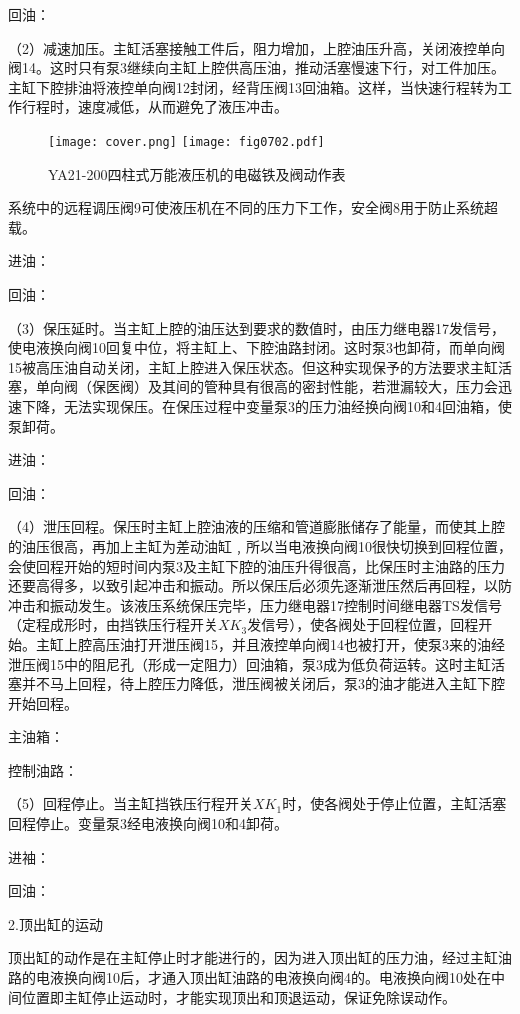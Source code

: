 

\noindent 回油：

（2）减速加压。主缸活塞接触工件后，阻力增加，上腔油压升高，关闭液控单向阀14。这时只有泵3继续向主缸上腔供高压油，推动活塞慢速下行，对工件加压。主缸下腔排油将液控单向阀12封闭，经背压阀13回油箱。这样，当快速行程转为工作行程时，速度减低，从而避免了液压冲击。

\begin{figure}
\centering
\ifOpenSource
\texttt{[image: cover.png]}
\else
\texttt{[image: fig0702.pdf]}
\fi
\caption{YA21-200四柱式万能液压机的电磁铁及阀动作表}
\label{fig:fig0702}
\end{figure}

系统中的远程调压阀9可使液压机在不同的压力下工作，安全阀8用于防止系统超载。

进油：

回油：

（3）保压延时。当主缸上腔的油压达到要求的数值时，由压力继电器17发信号，使电液换向阀10回复中位，将主缸上、下腔油路封闭。这时泵3也卸荷，而单向阀15被高压油自动关闭，主缸上腔进入保压状态。但这种实现保予的方法要求主缸活塞，单向阀（保医阀）及其间的管种具有很高的密封性能，若泄漏较大，压力会迅速下降，无法实现保压。在保压过程中变量泵3的压力油经换向阀10和4回油箱，使泵卸荷。

进油：

回油：

（4）泄压回程。保压时主缸上腔油液的压缩和管道膨胀储存了能量，而使其上腔的油压很高，再加上主缸为差动油缸﹐所以当电液换向阀10很快切换到回程位置，会使回程开始的短时间内泵3及主缸下腔的油压升得很高，比保压时主油路的压力还要高得多，以致引起冲击和振动。所以保压后必须先逐渐泄压然后再回程，以防冲击和振动发生。该液压系统保压完毕，压力继电器17控制时间继电器TS发信号（定程成形时，由挡铁压行程开关$XK_3$发信号），使各阀处于回程位置，回程开始。主缸上腔高压油打开泄压阀15，并且液控单向阀14也被打开，使泵3来的油经泄压阀15中的阻尼孔（形成一定阻力）回油箱，泵3成为低负荷运转。这时主缸活塞并不马上回程，待上腔压力降低，泄压阀被关闭后，泵3的油才能进入主缸下腔开始回程。

主油箱：

控制油路：

（5）回程停止。当主缸挡铁压行程开关$XK_1$时，使各阀处于停止位置，主缸活塞回程停止。变量泵3经电液换向阀10和4卸荷。

进袖：

回油：

2.顶出缸的运动

顶出缸的动作是在主缸停止时才能进行的，因为进入顶出缸的压力油，经过主缸油路的电液换向阀10后，才通入顶出缸油路的电液换向阀4的。电液换向阀10处在中间位置即主缸停止运动时，才能实现顶出和顶退运动，保证免除误动作。

